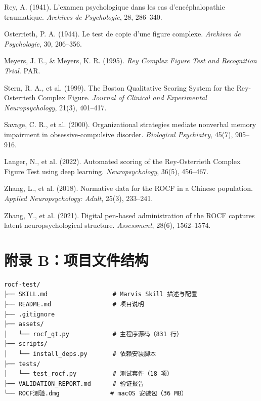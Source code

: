 \documentclass[12pt,a4paper]{ctexart}
\begin{document}
\begin{enumerate}[leftmargin=*, label={[\arabic*]}]
  \item Rey, A. (1941). L'examen psychologique dans les cas d'encéphalopathie traumatique. \textit{Archives de Psychologie}, 28, 286–340.
  \item Osterrieth, P. A. (1944). Le test de copie d'une figure complexe. \textit{Archives de Psychologie}, 30, 206–356.
  \item Meyers, J. E., \& Meyers, K. R. (1995). \textit{Rey Complex Figure Test and Recognition Trial}. PAR.
  \item Stern, R. A., et al. (1999). The Boston Qualitative Scoring System for the Rey-Osterrieth Complex Figure. \textit{Journal of Clinical and Experimental Neuropsychology}, 21(3), 401–417.
  \item Savage, C. R., et al. (2000). Organizational strategies mediate nonverbal memory impairment in obsessive-compulsive disorder. \textit{Biological Psychiatry}, 45(7), 905–916.
  \item Langer, N., et al. (2022). Automated scoring of the Rey-Osterrieth Complex Figure Test using deep learning. \textit{Neuropsychology}, 36(5), 456–467.
  \item Zhang, L., et al. (2018). Normative data for the ROCF in a Chinese population. \textit{Applied Neuropsychology: Adult}, 25(3), 233–241.
  \item Zhang, Y., et al. (2021). Digital pen-based administration of the ROCF captures latent neuropsychological structure. \textit{Assessment}, 28(6), 1562–1574.
\end{enumerate}

\section*{附录 B：项目文件结构}

\begin{verbatim}
rocf-test/
├── SKILL.md                  # Marvis Skill 描述与配置
├── README.md                 # 项目说明
├── .gitignore
├── assets/
│   └── rocf_qt.py            # 主程序源码（831 行）
├── scripts/
│   └── install_deps.py       # 依赖安装脚本
├── tests/
│   └── test_rocf.py          # 测试套件（18 项）
├── VALIDATION_REPORT.md      # 验证报告
└── ROCF测验.dmg              # macOS 安装包（36 MB）
\end{verbatim}
\end{document}

